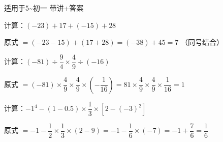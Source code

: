 \documentclass[a4paper,12pt]{ctexart}
\begin{document}
\pagestyle{empty}

\begin{center}
  \large 适用于5\~{}初一 \quad 带讲+答案
\end{center}
\vspace{0.3cm}




\begin{example}
计算：$(-23)+17+(-15)+28$
\end{example}
\begin{solution}
原式 $=(-23-15)+(17+28)=(-38)+45=7$ \quad（同号结合）
\end{solution}

\begin{example}
计算：$(-81)\div\dfrac{9}{4}\times\dfrac{4}{9}\div(-16)$
\end{example}
\begin{solution}
原式 $=(-81)\times\dfrac{4}{9}\times\dfrac{4}{9}\times\left(-\dfrac{1}{16}\right)=81\times\dfrac{4}{9}\times\dfrac{4}{9}\times\dfrac{1}{16}=1$
\end{solution}

\begin{example}
计算：$-1^4-(1-0.5)\times\dfrac{1}{3}\times[2-(-3)^2]$
\end{example}
\begin{solution}
原式 $=-1-\dfrac{1}{2}\times\dfrac{1}{3}\times(2-9)=-1-\dfrac{1}{6}\times(-7)=-1+\dfrac{7}{6}=\dfrac{1}{6}$
\end{solution}

\end{document}
